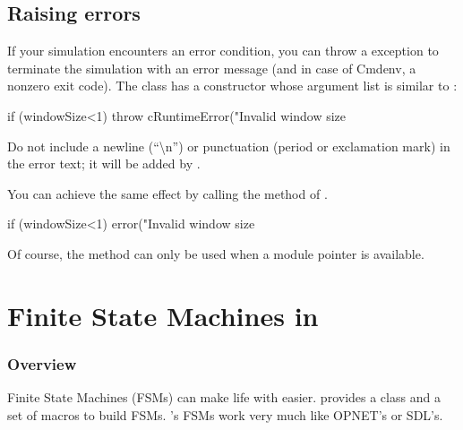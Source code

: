 \subsection{Raising errors}

If your simulation encounters an error condition, you can throw a
 exception to terminate the simulation with
an error message (and in case of Cmdenv, a nonzero exit code).
The  class has a constructor whose argument list
is similar to :

\begin{cpp}
if (windowSize<1)
    throw cRuntimeError("Invalid window size %
\end{cpp}

Do not include a newline (``{\textbackslash}n'') or punctuation (period
or exclamation mark) in the error text; it will be added by {\opp}.

You can achieve the same effect by calling the  method of
.

\begin{cpp}
if (windowSize<1)
    error("Invalid window size %
\end{cpp}

Of course, the  method can only be used when a module pointer
is available.



\section{Finite State Machines in {\opp}}
\label{sec:simple-modules:fsm}

\subsubsection{Overview}


Finite State Machines (FSMs)
can make life with  easier. {\opp} provides a
class and a set of macros to build FSMs. {\opp}'s FSMs work very much
like OPNET's or SDL's.


